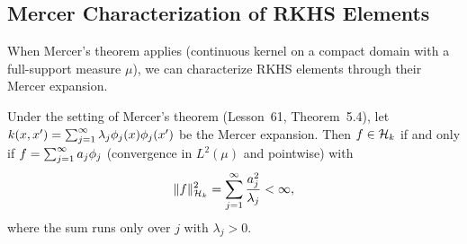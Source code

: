 \documentclass[11pt,a4paper]{article}
\begin{document}
\subsection{Mercer Characterization of RKHS Elements}

When Mercer's theorem applies (continuous kernel on a compact
domain with a full-support measure $\mu$), we can characterize
RKHS elements through their Mercer expansion.

\begin{theorem}
\label{thm:mercer-characterization}
Under the setting of Mercer's theorem (Lesson~61,
Theorem~5.4), let $k(x, x') = \sum_{j=1}^\infty
\lambda_j \phi_j(x) \phi_j(x')$ be the Mercer expansion.
Then $f \in \mathcal{H}_k$ if and only if $f = \sum_{j=1}^\infty a_j
\phi_j$ (convergence in $L^2(\mu)$ and pointwise) with
\begin{equation}
\label{eq:mercer-norm}
\|f\|_{\mathcal{H}_k}^2 = \sum_{j=1}^\infty \frac{a_j^2}{\lambda_j}
< \infty,
\end{equation}
where the sum runs only over $j$ with $\lambda_j > 0$.
\end{theorem}
\end{document}
